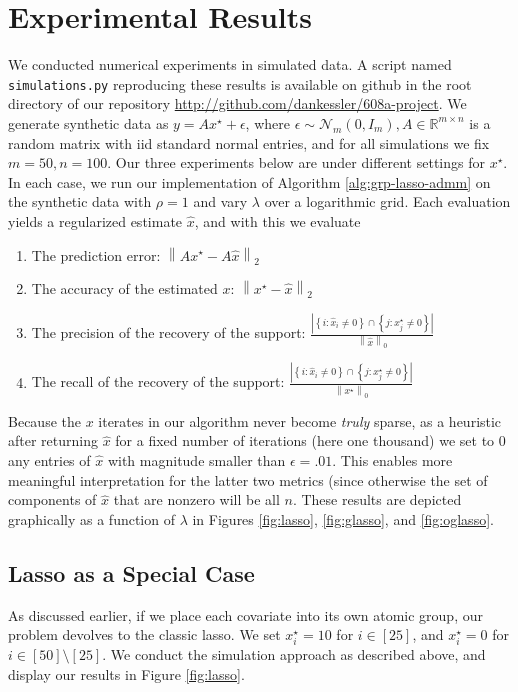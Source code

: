 \documentclass{article}
\begin{document}
\section{Experimental Results}
\label{sec:experimental-results}
We conducted numerical experiments in simulated data.
A script named \texttt{simulations.py} reproducing these results is available on github in the root directory of our repository \url{http://github.com/dankessler/608a-project}.
We generate synthetic data as $y = A x^{\star} + \epsilon$, where $\epsilon \sim \mathcal{N}_m(0,I_m), A \in \mathbb{R}^{m \times n}$ is a random matrix with iid standard normal entries, and for all simulations we fix $m = 50, n = 100$.
Our three experiments below are under different settings for $x^{\star}$.
In each case, we run our implementation of Algorithm \ref{alg:grp-lasso-admm} on the synthetic data with $\rho = 1$ and vary $\lambda$ over a logarithmic grid.
Each evaluation yields a regularized estimate $\hat{x}$, and with this we evaluate
\begin{enumerate}
\item The prediction error: $
  \left\|
    A x^{\star} - A \hat{x}
  \right\|_2$
\item The accuracy of the estimated $x$: $
  \left\|
    x^{\star} - \hat{x}
  \right\|_2$
\item The precision of the recovery of the support: $\frac{
    \left|
      \left\{
        i: \hat{x}_i \neq 0
      \right\}
      \cap
      \left\{
        j: x^{\star}_j \neq 0
      \right\}
    \right|}{
    \left\|
      \hat{x}
    \right\|_0}$
\item The recall of the recovery of the support: $\frac{
    \left|
      \left\{
        i: \hat{x}_i \neq 0
      \right\}
      \cap
      \left\{
        j: x^{\star}_j \neq 0
      \right\}
    \right|}{
    \left\|
      x^{\star}
    \right\|_0}$
\end{enumerate}
Because the $x$ iterates in our algorithm never become \emph{truly} sparse, as a heuristic after returning $\hat{x}$ for a fixed number of iterations (here one thousand) we set to 0 any entries of $\hat{x}$ with magnitude smaller than $\epsilon = .01$.
This enables more meaningful interpretation for the latter two metrics (since otherwise the set of components of $\hat{x}$ that are nonzero will be all $n$.
These results are depicted graphically as a function of $\lambda$ in Figures \ref{fig:lasso}, \ref{fig:glasso}, and \ref{fig:oglasso}.


\subsection{Lasso as a Special Case}
\label{sec:lasso-as-special}
As discussed earlier, if we place each covariate into its own atomic group, our problem devolves to the classic lasso.
We set $x_i^{\star} = 10$ for $i \in [25]$, and $x_i^{\star} = 0$ for $i \in [50] \setminus [25]$.
We conduct the simulation approach as described above, and display our results in Figure \ref{fig:lasso}.
\end{document}
